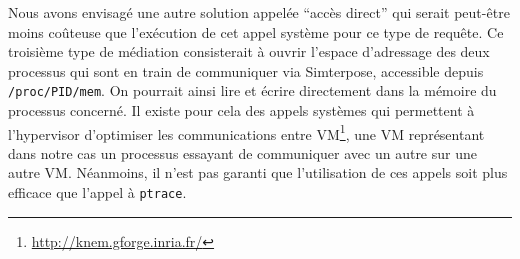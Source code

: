 Nous avons envisagé une autre solution appelée ``accès direct'' qui serait peut-être moins coûteuse que l'exécution de cet appel système pour ce type de requête. Ce troisième type de médiation consisterait à ouvrir l'espace d'adressage des deux processus qui sont en train de communiquer via Simterpose, accessible depuis \texttt{/proc/PID/mem}. On pourrait ainsi lire et écrire directement dans la mémoire du processus concerné. Il existe pour cela des appels systèmes qui permettent à l'hypervisor d'optimiser les communications entre VM\footnote{\url{http://knem.gforge.inria.fr/}}, une VM représentant dans notre cas un processus essayant de communiquer avec un autre sur une autre VM. Néanmoins, il n'est pas garanti que l'utilisation de ces appels soit plus efficace que l'appel à \texttt{ptrace}.

